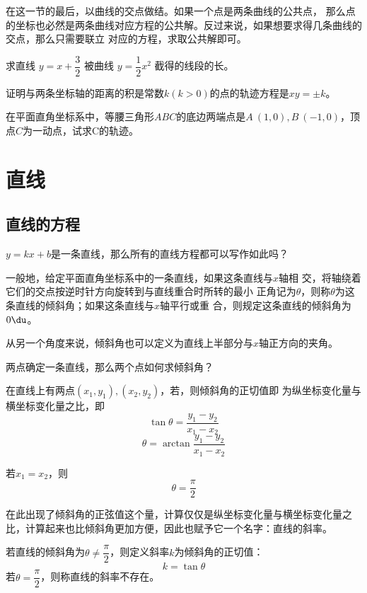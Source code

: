 在这一节的最后，以曲线的交点做结。如果一个点是两条曲线的公共点，
那么点的坐标也必然是两条曲线对应方程的公共解。反过来说，如果想要求得几条曲线的交点，那么只需要联立
对应的方程，求取公共解即可。
\begin{example}
    求直线 $ y=x+\dfrac{3}{2} $ 被曲线  $y=\dfrac{1}{2} x^{2}$  截得的线段的长。
\end{example}
\begin{jie}
    
\end{jie}
\clearpage
\review
\clearpage
\hw
\begin{homework}
    证明与两条坐标轴的距离的积是常数$k(k>0)$的点的轨迹方程是$xy=\pm k$。
\end{homework}
\begin{homework}
    在平面直角坐标系中，等腰三角形\(ABC\)的底边两端点是\(A\ (1,0),B\ (-1,0)\)，顶点\(C\)为一动点，试求C的轨迹。
\end{homework}
\clearpage


\section{直线}
\subsection{直线的方程}
\(y=kx+b\)是一条直线，那么所有的直线方程都可以写作如此吗？
\begin{definition}[直线的倾斜角]
    一般地，给定平面直角坐标系中的一条直线，如果这条直线与\(x\)轴相
    交，将轴绕着它们的交点按逆时针方向旋转到与直线重合时所转的最小
    正角记为\(\theta\)，则称\(\theta\)为这条直线的倾斜角；如果这条直线与\(x\)轴平行或重
    合，则规定这条直线的倾斜角为\(0\du\)。

    从另一个角度来说，倾斜角也可以定义为直线上半部分与\(x\)轴正方向的夹角。
\end{definition}
两点确定一条直线，那么两个点如何求倾斜角？

\begin{theorem}
    在直线上有两点\((x_1,y_1),(x_2,y_2)\)，若\(\)，则倾斜角的正切值即
    为纵坐标变化量与横坐标变化量之比，即
    \begin{equation}
        \tan\theta=\frac{y_1-y_2}{x_1-x_2}
    \end{equation}
    \begin{equation}
        \theta=\arctan\frac{y_1-y_2}{x_1-x_2}
    \end{equation}

    若\(x_1= x_2\)，则\begin{equation}
        \theta=\dfrac{\pi}{2}
    \end{equation}
\end{theorem}
在此出现了倾斜角的正弦值这个量，计算仅仅是纵坐标变化量与横坐标变化量之比，计算起来也比倾斜角更加方便，因此也赋予它一个名字：直线的斜率。
\begin{definition}[直线的斜率]若直线的倾斜角为\(\theta\neq\dfrac{\pi}{2}\)，则定义斜率\(k\)为倾斜角的正切值：
   \begin{equation}
     k=\tan\theta
   \end{equation}
   若\(\theta=\dfrac{\pi}{2}\)，则称直线的斜率不存在。
\end{definition}

